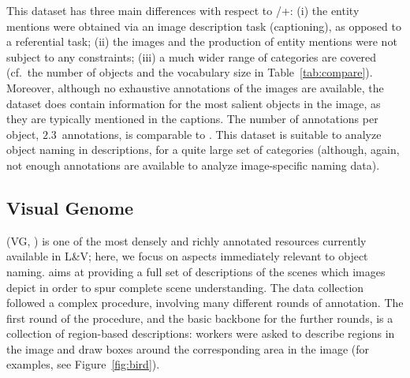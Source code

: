 This dataset has three main differences with respect to /+: (i) the entity mentions were obtained via an image description task (captioning), as opposed to a referential task; (ii) the images and the production of entity mentions were not subject to any constraints; (iii) a much wider range of categories are covered (cf.\ the number of objects and the vocabulary size in Table~\ref{tab:compare}). %
Moreover, although no exhaustive annotations of the images are available, the dataset does contain information for the most salient objects in the image, as they are typically mentioned in the captions.
The number of annotations per object, $2.3$\ annotations, is comparable to .
This dataset is suitable to analyze object naming in descriptions, for a quite large set of categories (although, again, not enough annotations are available to analyze image-specific naming data).


\subsection{Visual Genome}
\label{sec:vg-survey}

\vgenome (VG, ) is one of the most densely and richly annotated resources currently available in L\&V; here, we focus on aspects immediately relevant to object naming.
\vg aims at providing a full set of descriptions of the scenes which images depict in order to spur complete scene understanding. 
The data collection followed a complex procedure, involving many different rounds of annotation.
The first round of the procedure, and the basic backbone for the further rounds, is a collection of region-based descriptions: workers were asked to describe regions in the image and draw boxes around the corresponding area in the image (for examples, see Figure~\ref{fig:bird}).

